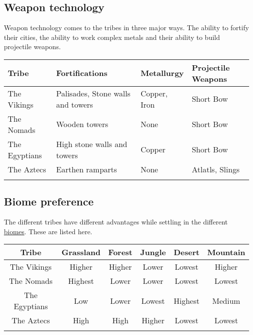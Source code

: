 \begin{landscape}
	\newpage

	\subsection{Weapon technology}
	Weapon technology comes to the tribes in three major ways. The ability to
	fortify their cities, the ability to work complex metals and their ability to
	build projectile weapons.

	\begin{longtable}{p{5cm}p{5cm}p{4cm}p{6cm}}
		\toprule{}
		Tribe
		 & Fortifications
		 & Metallurgy
		 & Projectile Weapons                \\
		\midrule{}
		The \gls{Vikings}
		 & Palisades, Stone walls and towers
		 & Copper, Iron
		 & Short Bow                         \\
		The \gls{Nomads}
		 & Wooden towers
		 & None
		 & Short Bow                         \\
		The \gls{Egyptians}
		 & High stone walls and towers
		 & Copper
		 & Short Bow                         \\
		The \gls{Aztecs}
		 & Earthen ramparts
		 & None
		 & Atlatls, Slings                   \\
		\bottomrule{}
	\end{longtable}

	\subsection{Biome preference}
	The different tribes have different advantages while settling in the different
	\hyperref[ch:World:Biomes]{biomes}. These are listed here.

	\begin{longtable}{cccccc}
		\toprule{}
		Tribe
		 & \Gls*{Grassland}
		 & \Gls*{Forest}
		 & \Gls*{Jungle}
		 & \Gls*{Desert}
		 & \Gls*{Mountain}  \\
		\midrule{}
		The \gls{Vikings}
		 & Higher
		 & Higher
		 & Lower
		 & Lowest
		 & Higher           \\
		The \gls{Nomads}
		 & Highest
		 & Lower
		 & Lower
		 & Lowest
		 & Lowest           \\
		The \gls{Egyptians}
		 & Low
		 & Lower
		 & Lowest
		 & Highest
		 & Medium           \\
		The \gls{Aztecs}
		 & High
		 & High
		 & Higher
		 & Lowest
		 & Lowest           \\
		\bottomrule{}
	\end{longtable}

\end{landscape}
